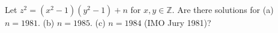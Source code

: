 Let $z^2 = (x^2 - 1)(y^2 - 1) + n$ for $x, y \in \mathbb{Z}$. Are there solutions for (a) $n = 1981$. (b) $n = 1985$. (c) $n = 1984$ (IMO Jury 1981)?
